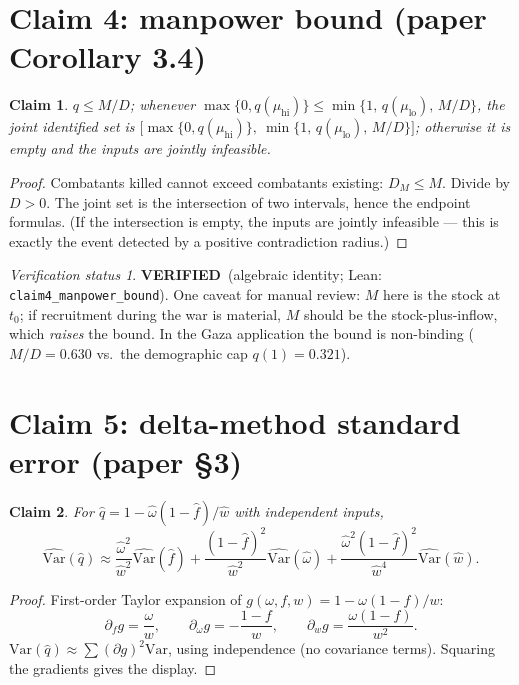 \documentclass[11pt,a4paper]{article}
\theoremstyle{plain}
\newtheorem{claim}{Claim}
\theoremstyle{remark}
\newtheorem*{verification}{Verification status}
\newcommand{\PASS}{\textcolor{green!50!black}{\textbf{VERIFIED}}}
\begin{document}
\section{Claim 4: manpower bound (paper Corollary 3.4)}

\begin{claim}\label{cl:manpower}
$q \le M/D$; whenever $\max\{0,q(\mu_{\mathrm{hi}})\}\le\min\{1,\,q(\mu_{\mathrm{lo}}),\,M/D\}$, the joint identified set is $\bigl[\max\{0,q(\mu_{\mathrm{hi}})\},\ \min\{1,\,q(\mu_{\mathrm{lo}}),\,M/D\}\bigr]$; otherwise it is empty and the inputs are jointly infeasible.
\end{claim}

\begin{proof}
Combatants killed cannot exceed combatants existing: $D_M\le M$. Divide by $D>0$. The joint set is the intersection of two intervals, hence the endpoint formulas. (If the intersection is empty, the inputs are jointly infeasible --- this is exactly the event detected by a positive contradiction radius.)
\end{proof}

\begin{verification}
\PASS\ (algebraic identity; Lean: \texttt{claim4\_manpower\_bound}). One caveat for manual review: $M$ here is the stock at $t_0$; if recruitment during the war is material, $M$ should be the stock-plus-inflow, which \emph{raises} the bound. In the Gaza application the bound is non-binding ($M/D=0.630$ vs.\ the demographic cap $q(1)=0.321$).
\end{verification}

\section{Claim 5: delta-method standard error (paper \S3)}

\begin{claim}\label{cl:delta}
For $\hat q = 1-\hat\omega(1-\hat f)/\hat w$ with independent inputs,
\[
\widehat{\mathrm{Var}}(\hat q)\approx
\frac{\hat\omega^2}{\hat w^2}\widehat{\mathrm{Var}}(\hat f)
+\frac{(1-\hat f)^2}{\hat w^2}\widehat{\mathrm{Var}}(\hat\omega)
+\frac{\hat\omega^2(1-\hat f)^2}{\hat w^4}\widehat{\mathrm{Var}}(\hat w).
\]
\end{claim}

\begin{proof}
First-order Taylor expansion of $g(\omega,f,w)=1-\omega(1-f)/w$:
\[
\partial_f g = \frac{\omega}{w},\qquad
\partial_\omega g = -\frac{1-f}{w},\qquad
\partial_w g = \frac{\omega(1-f)}{w^2}.
\]
$\mathrm{Var}(\hat q)\approx\sum(\partial g)^2\mathrm{Var}$, using independence (no covariance terms). Squaring the gradients gives the display.
\end{proof}
\end{document}
